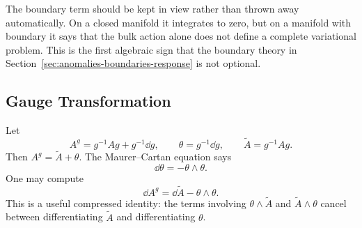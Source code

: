 The boundary term should be kept in view rather than thrown away automatically. On a closed manifold it integrates to zero, but on a manifold with boundary it says that the bulk action alone does not define a complete variational problem. This is the first algebraic sign that the boundary theory in Section~\ref{sec:anomalies-boundaries-response} is not optional.

\subsection{Gauge Transformation}
\label{subsec:dense-gauge-transform-cs}

Let
\begin{equation}
  A^g=g^{-1}Ag+g^{-1}\dd g,
  \qquad
  \theta=g^{-1}\dd g,
  \qquad
  \widetilde A=g^{-1}Ag.
  \label{eq:dense-gauge-notation}
\end{equation}
Then $A^g=\widetilde A+\theta$. The Maurer--Cartan equation says
\begin{equation}
  \dd\theta=-\theta\wedge\theta.
  \label{eq:dense-MC}
\end{equation}
One may compute
\begin{equation}
  \dd A^g
  =
  \dd\widetilde A-\theta\wedge\theta.
  \label{eq:dense-dAg}
\end{equation}
This is a useful compressed identity: the terms involving $\theta\wedge\widetilde A$ and $\widetilde A\wedge\theta$ cancel between differentiating $\widetilde A$ and differentiating $\theta$.

